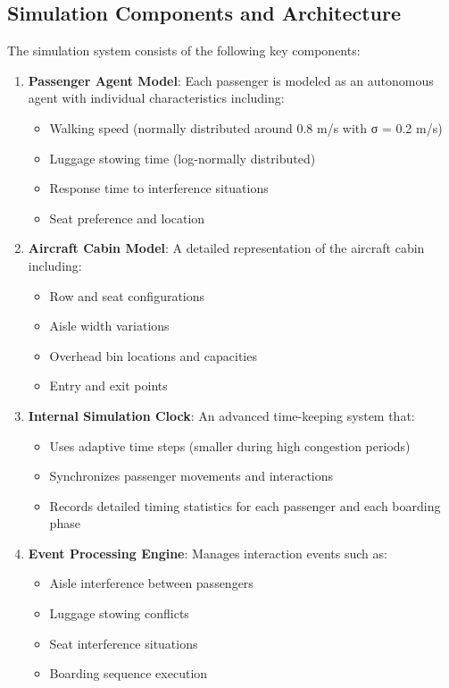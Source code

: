 \documentclass[12pt,a4paper]{article}
\begin{document}
\subsection{Simulation Components and Architecture}

The simulation system consists of the following key components:

\begin{enumerate}
    \item \textbf{Passenger Agent Model}: Each passenger is modeled as an autonomous agent with individual characteristics including:
       \begin{itemize}
          \item Walking speed (normally distributed around 0.8 m/s with σ = 0.2 m/s)
          \item Luggage stowing time (log-normally distributed)
          \item Response time to interference situations
          \item Seat preference and location
       \end{itemize}
    
    \item \textbf{Aircraft Cabin Model}: A detailed representation of the aircraft cabin including:
       \begin{itemize}
          \item Row and seat configurations
          \item Aisle width variations
          \item Overhead bin locations and capacities
          \item Entry and exit points
       \end{itemize}
    
    \item \textbf{Internal Simulation Clock}: An advanced time-keeping system that:
       \begin{itemize}
          \item Uses adaptive time steps (smaller during high congestion periods)
          \item Synchronizes passenger movements and interactions
          \item Records detailed timing statistics for each passenger and each boarding phase
       \end{itemize}
    
    \item \textbf{Event Processing Engine}: Manages interaction events such as:
       \begin{itemize}
          \item Aisle interference between passengers
          \item Luggage stowing conflicts
          \item Seat interference situations
          \item Boarding sequence execution
       \end{itemize}
\end{enumerate}
\end{document}
